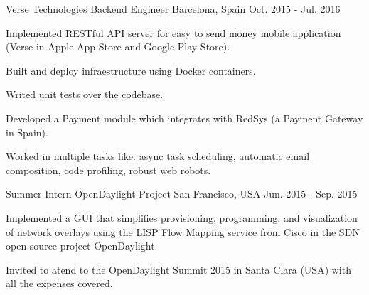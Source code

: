 
\begin{cventries}

\cventry
  {Verse Technologies}
  {Backend Engineer}
  {Barcelona, Spain}
  {Oct. 2015 - Jul. 2016}
  {
    \begin{cvitems} %
      \item{Implemented RESTful API server for easy to send money mobile application (Verse in Apple App Store and Google Play Store).}
      \item{Built and deploy infraestructure using Docker containers.}
      \item{Writed unit tests over the codebase.}
      \item{Developed a Payment module which integrates with RedSys (a Payment Gateway in Spain).}
      \item{Worked in multiple tasks like: async task scheduling, automatic email composition, code profiling, robust web robots.}
    \end{cvitems}
  }

\cventry
	{Summer Intern}
	{OpenDaylight Project}
	{San Francisco, USA}
	{Jun. 2015 - Sep. 2015}
	{
    \begin{cvitems}
      \item{Implemented a GUI that simplifies provisioning, programming, and
		visualization of network overlays using the LISP Flow Mapping service from
  Cisco in the SDN open source project OpenDaylight.}
\item{Invited to atend to the OpenDaylight Summit 2015 in Santa Clara (USA) with all the expenses covered.}
    \end{cvitems}
  }


\end{cventries}
